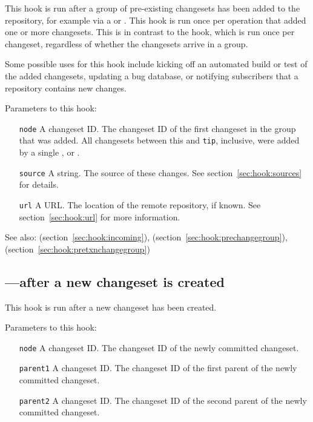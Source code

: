 This hook is run after a group of pre-existing changesets has been
added to the repository, for example via a  or
.  This hook is run once per operation that added one
or more changesets.  This is in contrast to the  hook,
which is run once per changeset, regardless of whether the changesets
arrive in a group.

Some possible uses for this hook include kicking off an automated
build or test of the added changesets, updating a bug database, or
notifying subscribers that a repository contains new changes.

Parameters to this hook:
\begin{itemize}
\item[\texttt{node}] A changeset ID.  The changeset ID of the first
  changeset in the group that was added.  All changesets between this
  and \texttt{tip}, inclusive, were added by
  a single ,  or .
\item[\texttt{source}] A string.  The source of these changes.  See
  section~\ref{sec:hook:sources} for details.
\item[\texttt{url}] A URL.  The location of the remote repository, if
  known.  See section~\ref{sec:hook:url} for more information.
\end{itemize}

See also:  (section~\ref{sec:hook:incoming}),
 (section~\ref{sec:hook:prechangegroup}),
 (section~\ref{sec:hook:pretxnchangegroup})

\subsection{---after a new changeset is created}
\label{sec:hook:commit}

This hook is run after a new changeset has been created.

Parameters to this hook:
\begin{itemize}
\item[\texttt{node}] A changeset ID.  The changeset ID of the newly
  committed changeset.
\item[\texttt{parent1}] A changeset ID.  The changeset ID of the first
  parent of the newly committed changeset.
\item[\texttt{parent2}] A changeset ID.  The changeset ID of the second
  parent of the newly committed changeset.
\end{itemize}

